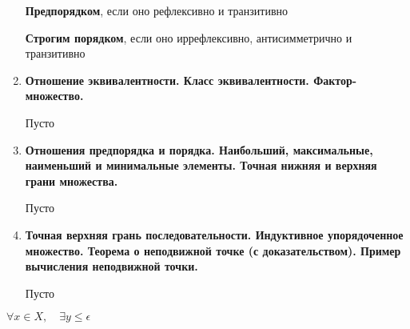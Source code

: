 \documentclass[]{article}
\begin{document}
\begin{enumerate}
\textbf{Предпорядком}, если оно рефлексивно и транзитивно

\textbf{Строгим порядком}, если оно иррефлексивно, антисимметрично и транзитивно


\hrulefill
\item %
\textbf{Отношение эквивалентности. Класс эквивалентности. Фактор-множество.}

\hrulefill

{\color{red} Пусто}

\hrulefill
\item %
\textbf{Отношения предпорядка и порядка. Наибольший, максимальные, наименьший и минимальные элементы. Точная нижняя и верхняя грани множества.}

\hrulefill

{\color{red} Пусто}

\hrulefill
\item %
\textbf{Точная верхняя грань последовательности. Индуктивное упорядоченное множество. Теорема о неподвижной точке (с доказательством). Пример вычисления неподвижной точки.}

\hrulefill

{\color{red} Пусто}

\end{enumerate}



$\forall x \in X, \quad \exists y \leq \epsilon$

\section{}
\end{document}
